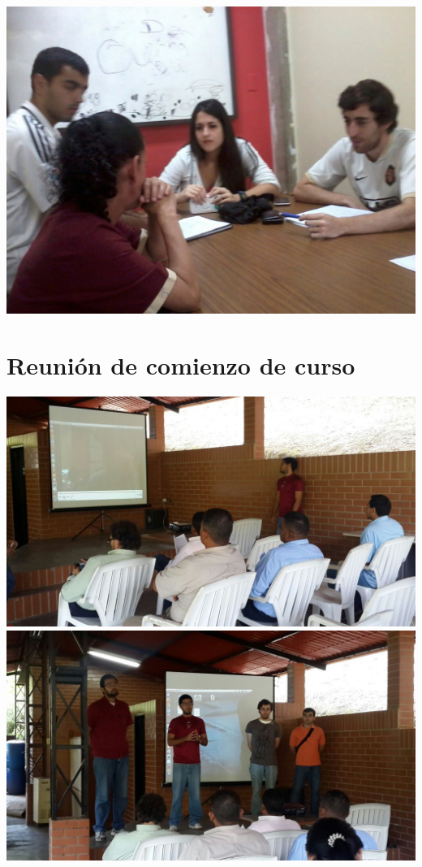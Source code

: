 \includegraphics[scale=0.3]{./Anexos/img/p3.jpg}\\
\pagebreak

\section*{Reunión de comienzo de curso}
\includegraphics[scale=0.3]{./Anexos/img/1.jpg}\\

\includegraphics[scale=0.3]{./Anexos/img/11.jpg}\\

